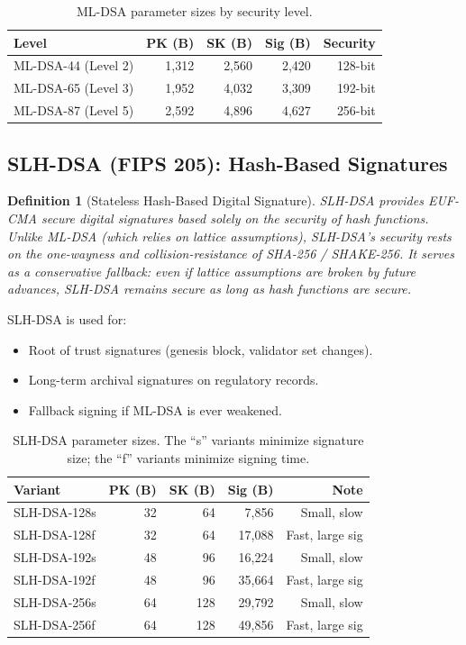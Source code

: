 \documentclass[11pt,a4paper]{article}
\newtheorem{definition}{Definition}[section]
\begin{document}
\begin{table}[h]
\centering
\begin{tabular}{lrrrr}
\toprule
\textbf{Level} & \textbf{PK (B)} & \textbf{SK (B)} &
\textbf{Sig (B)} & \textbf{Security} \\
\midrule
ML-DSA-44 (Level 2) & 1,312  & 2,560  & 2,420  & 128-bit \\
ML-DSA-65 (Level 3) & 1,952  & 4,032  & 3,309  & 192-bit \\
ML-DSA-87 (Level 5) & 2,592  & 4,896  & 4,627  & 256-bit \\
\bottomrule
\end{tabular}
\caption{ML-DSA parameter sizes by security level.}
\label{tab:mldsa-sizes}
\end{table}

\subsection{SLH-DSA (FIPS 205): Hash-Based Signatures}

\begin{definition}[Stateless Hash-Based Digital Signature]
SLH-DSA provides EUF-CMA secure digital signatures based solely on the
security of hash functions.  Unlike ML-DSA (which relies on lattice
assumptions), SLH-DSA's security rests on the one-wayness and
collision-resistance of SHA-256 / SHAKE-256.  It serves as a
conservative fallback: even if lattice assumptions are broken by
future advances, SLH-DSA remains secure as long as hash functions
are secure.
\end{definition}

SLH-DSA is used for:
\begin{itemize}[nosep]
  \item Root of trust signatures (genesis block, validator set changes).
  \item Long-term archival signatures on regulatory records.
  \item Fallback signing if ML-DSA is ever weakened.
\end{itemize}

\begin{table}[h]
\centering
\begin{tabular}{lrrrr}
\toprule
\textbf{Variant} & \textbf{PK (B)} & \textbf{SK (B)} &
\textbf{Sig (B)} & \textbf{Note} \\
\midrule
SLH-DSA-128s & 32  & 64  & 7,856  & Small, slow \\
SLH-DSA-128f & 32  & 64  & 17,088 & Fast, large sig \\
SLH-DSA-192s & 48  & 96  & 16,224 & Small, slow \\
SLH-DSA-192f & 48  & 96  & 35,664 & Fast, large sig \\
SLH-DSA-256s & 64  & 128 & 29,792 & Small, slow \\
SLH-DSA-256f & 64  & 128 & 49,856 & Fast, large sig \\
\bottomrule
\end{tabular}
\caption{SLH-DSA parameter sizes.  The ``s'' variants minimize signature
size; the ``f'' variants minimize signing time.}
\label{tab:slhdsa-sizes}
\end{table}
\end{document}
